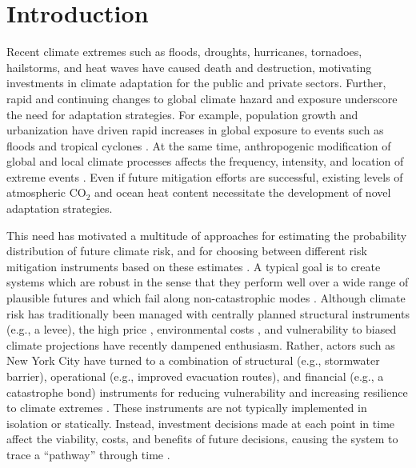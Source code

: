 \documentclass[
  draft,
  linenumbers
]{agujournal2019}
\begin{document}

\section{Introduction}\label{sec:introduction}

Recent climate extremes such as floods, droughts, hurricanes, tornadoes, hailstorms, and heat waves have caused death and destruction, motivating investments in climate adaptation for the public and private sectors.
Further, rapid and continuing changes to global climate hazard and exposure underscore the need for adaptation strategies.
For example, population growth and urbanization have driven rapid increases in global exposure to events such as floods \citep{Jongman:2012cr} and tropical cyclones \citep{Peduzzi:2012iq}.
At the same time, anthropogenic modification of global and local climate processes affects the frequency, intensity, and location of extreme events \citep{IPCC:2012wt, Milly:2008dg, Shaw:2016bo}.
Even if future mitigation efforts are successful, existing levels of atmospheric $\text{CO}_2$ and ocean heat content necessitate the development of novel adaptation strategies.

This need has motivated a multitude of approaches for estimating the probability distribution of future climate risk, and for choosing between different risk mitigation instruments based on these estimates \citep[see, e.g.\@\xspace,][]{Merz:2014gf}.
A typical goal is to create systems which are robust in the sense that they perform well over a wide range of plausible futures \citep{lempert:2007,Borgomeo:2018hk} and which fail along non-catastrophic modes \citep{brown:2010}.
Although climate risk has traditionally been managed with centrally planned structural instruments (e.g.\@\xspace, a levee), the high price \citep{Papakonstantinou:2016ve}, environmental costs \citep{dugan:2010}, and vulnerability to biased climate projections \citep{lempert:2007} have recently dampened enthusiasm.
Rather, actors such as New York City have turned to a combination of structural (e.g.\@\xspace, stormwater barrier), operational (e.g.\@\xspace, improved evacuation routes), and financial (e.g.\@\xspace, a catastrophe bond) instruments for reducing vulnerability and increasing resilience to climate extremes \citep{CityofNewYork:2013uh}.
These instruments are not typically implemented in isolation or statically.
Instead, investment decisions made at each point in time affect the viability, costs, and benefits of future decisions, causing the system to trace a ``pathway'' through time \citep{Walker:2013gi,Haasnoot:2013im,Haasnoot:2015dh}.
\end{document}
